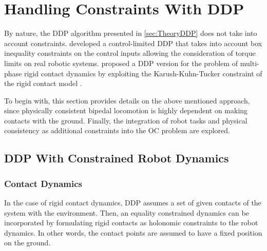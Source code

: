 %
%
%


\section{Handling Constraints With DDP}\label{sec:TheoryConstrainedDDP}
By nature, the \gls{DDP} algorithm presented in \cref{sec:TheoryDDP} does not take into account constraints. \citeauthor{tassa2014control} developed a control-limited \gls{DDP} \cite{tassa2014control} that takes into account box inequality constraints on the control inputs allowing the consideration of torque limits on real robotic systems. \citeauthor{budhiraja2018differential} proposed a \gls{DDP} version for the problem of multi-phase rigid contact dynamics by exploiting the Karush-Kuhn-Tucker constraint of the rigid contact model \cite{budhiraja2018differential}. 

To begin with, this section provides details on the above mentioned approach, since physically consistent bipedal locomotion is highly dependent on making contacts with the ground. Finally, the integration of robot tasks and physical consistency as additional constraints into the \gls{OC} problem are explored. 

\subsection{DDP With Constrained Robot Dynamics}\label{subsec:DDPConstrainedRobotDynamics}
\subsubsection{Contact Dynamics}
In the case of rigid contact dynamics, \gls{DDP} assumes a set of given contacts of the system with the environment. Then, an equality constrained dynamics can be incorporated by formulating rigid contacts as holonomic constraints to the robot dynamics. In other words, the contact points are assumed to have a fixed position on the ground. 

